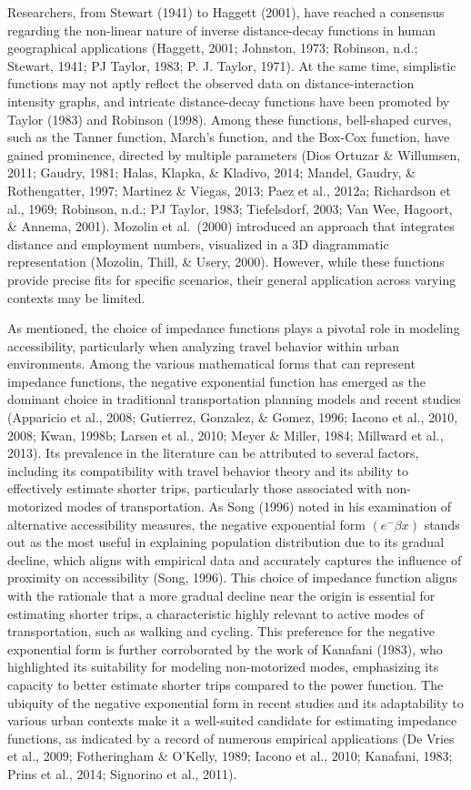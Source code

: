 \documentclass[12pt,twoside]{reedthesis}
\begin{document}
Researchers, from Stewart (1941) to Haggett (2001), have reached a consensus regarding the non-linear nature of inverse distance-decay functions in human geographical applications (Haggett, 2001; Johnston, 1973; Robinson, n.d.; Stewart, 1941; PJ Taylor, 1983; P. J. Taylor, 1971). At the same time, simplistic functions may not aptly reflect the observed data on distance-interaction intensity graphs, and intricate distance-decay functions have been promoted by Taylor (1983) and Robinson (1998). Among these functions, bell-shaped curves, such as the Tanner function, March's function, and the Box-Cox function, have gained prominence, directed by multiple parameters (Dios Ortuzar \& Willumsen, 2011; Gaudry, 1981; Halas, Klapka, \& Kladivo, 2014; Mandel, Gaudry, \& Rothengatter, 1997; Martinez \& Viegas, 2013; Paez et al., 2012a; Richardson et al., 1969; Robinson, n.d.; PJ Taylor, 1983; Tiefelsdorf, 2003; Van Wee, Hagoort, \& Annema, 2001). Mozolin et al.~(2000) introduced an approach that integrates distance and employment numbers, visualized in a 3D diagrammatic representation (Mozolin, Thill, \& Usery, 2000). However, while these functions provide precise fits for specific scenarios, their general application across varying contexts may be limited.

As mentioned, the choice of impedance functions plays a pivotal role in modeling accessibility, particularly when analyzing travel behavior within urban environments. Among the various mathematical forms that can represent impedance functions, the negative exponential function has emerged as the dominant choice in traditional transportation planning models and recent studies (Apparicio et al., 2008; Gutierrez, Gonzalez, \& Gomez, 1996; Iacono et al., 2010, 2008; Kwan, 1998b; Larsen et al., 2010; Meyer \& Miller, 1984; Millward et al., 2013). Its prevalence in the literature can be attributed to several factors, including its compatibility with travel behavior theory and its ability to effectively estimate shorter trips, particularly those associated with non-motorized modes of transportation. As Song (1996) noted in his examination of alternative accessibility measures, the negative exponential form \((e ^-\beta x)\) stands out as the most useful in explaining population distribution due to its gradual decline, which aligns with empirical data and accurately captures the influence of proximity on accessibility (Song, 1996). This choice of impedance function aligns with the rationale that a more gradual decline near the origin is essential for estimating shorter trips, a characteristic highly relevant to active modes of transportation, such as walking and cycling. This preference for the negative exponential form is further corroborated by the work of Kanafani (1983), who highlighted its suitability for modeling non-motorized modes, emphasizing its capacity to better estimate shorter trips compared to the power function. The ubiquity of the negative exponential form in recent studies and its adaptability to various urban contexts make it a well-suited candidate for estimating impedance functions, as indicated by a record of numerous empirical applications (De Vries et al., 2009; Fotheringham \& O'Kelly, 1989; Iacono et al., 2010; Kanafani, 1983; Prins et al., 2014; Signorino et al., 2011).
\end{document}
